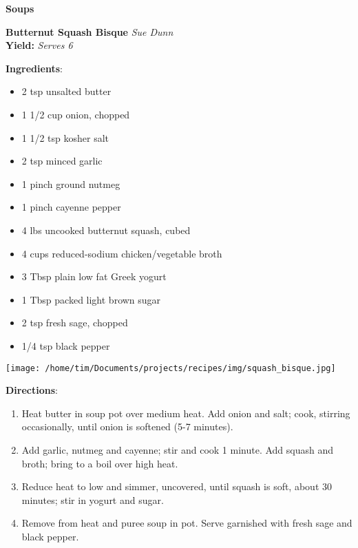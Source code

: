 \documentclass[11pt, twoside, openany]{book}
\begin{document}
{\newpage \LARGE \textbf{Soups}} \label{soups}\\
\noindent\begin{minipage}[t]{\linewidth}%
{\Large\textbf{Butternut Squash Bisque}} \label{butternut-squash-bisque}\hfill\textit{Sue Dunn}\\
\textbf{Yield:} \textit{Serves 6}\\
\noindent\begin{minipage}[t]{0.78\linewidth}%
\textbf{Ingredients}:\vspace{-3mm}
\begin{multicols}{2}
\begin{itemize}\setlength\itemsep{-1mm}
\item 2 tsp unsalted butter
\item 1 1/2 cup onion, chopped
\item 1 1/2 tsp kosher salt
\item 2 tsp minced garlic
\item 1 pinch ground nutmeg
\item 1 pinch cayenne pepper
\item 4 lbs uncooked butternut squash, cubed
\item 4 cups reduced-sodium chicken/vegetable broth
\item 3 Tbsp plain low fat Greek yogurt
\item 1 Tbsp packed light brown sugar
\item 2 tsp fresh sage, chopped
\item 1/4 tsp black pepper
\end{itemize}
\end{multicols}
\end{minipage}
\noindent\begin{minipage}[t]{0.18\linewidth}
\centering \strut\vspace*{-\baselineskip}\newline
\texttt{[image: /home/tim/Documents/projects/recipes/img/squash\_bisque.jpg]}\\
\end{minipage}\vspace{3mm}
\textbf{Directions}:
\vspace{-3mm}\begin{enumerate}\setlength\itemsep{-1mm}
\item Heat butter in soup pot over medium heat. Add onion and salt; cook, stirring occasionally, until onion is softened (5-7 minutes).
\item Add garlic, nutmeg and cayenne; stir and cook 1 minute. Add squash and broth; bring to a boil over high heat.
\item Reduce heat to low and simmer, uncovered, until squash is soft, about 30 minutes; stir in yogurt and sugar.
\item Remove from heat and puree soup in pot. Serve garnished with fresh sage and black pepper.
\end{enumerate}
\end{minipage}\vspace{8mm}
\end{document}
